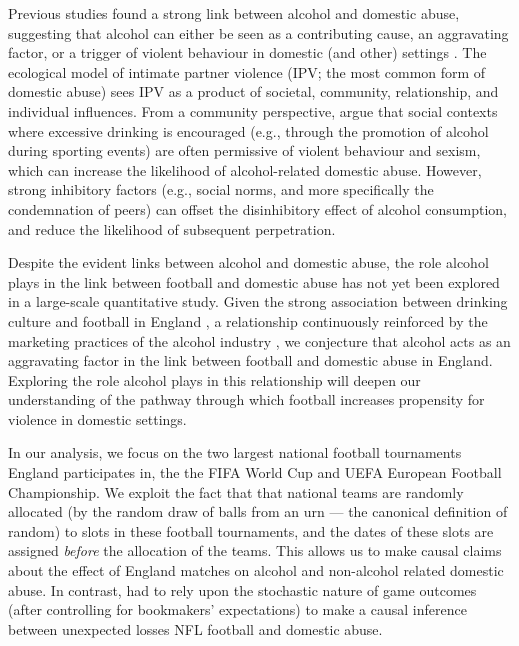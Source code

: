 \documentclass[12pt, a4paper]{article}
\begin{document}
Previous studies found a strong link between alcohol and domestic abuse, suggesting that alcohol can either be seen as a contributing cause, an aggravating factor, or a trigger of violent behaviour in domestic (and other) settings \cite{Leonard2017}. The ecological model of intimate partner violence (IPV; the most common form of domestic abuse) sees IPV as a product of societal, community, relationship, and individual influences. From a community perspective,  argue that social contexts where excessive drinking is encouraged (e.g., through the promotion of alcohol during sporting events) are often permissive of violent behaviour and sexism, which can increase the likelihood of alcohol-related domestic abuse. However, strong inhibitory factors (e.g., social norms, and more specifically the condemnation of peers) can offset the disinhibitory effect of alcohol consumption, and reduce the likelihood of subsequent perpetration.  



Despite the evident links between alcohol and domestic abuse, the role alcohol plays in the link between football and domestic abuse has not yet been explored in a large-scale quantitative study. Given the strong association between drinking culture and football in England \cite{Dixon2014}, a relationship continuously reinforced by the marketing practices of the alcohol industry \cite{Gornall2014}, we conjecture that alcohol acts as an aggravating factor in the link between football and domestic abuse in England. Exploring the role alcohol plays in this relationship will deepen our understanding of the pathway through which football increases propensity for violence in domestic settings.

In our analysis, we focus on the two largest national football tournaments England participates in, the the FIFA World Cup and UEFA European Football Championship. We exploit the fact that that national teams are randomly allocated (by the random draw of balls from an urn --- the canonical definition of random) to slots in these football tournaments, and the dates of these slots are assigned \emph{before} the allocation of the teams. This allows us to make causal claims about the effect of England matches on alcohol and non-alcohol related domestic abuse. In contrast,  had to rely upon the stochastic nature of game outcomes (after controlling for bookmakers' expectations) to make a causal inference between unexpected losses NFL football and domestic abuse. 
\end{document}
